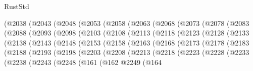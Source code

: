 \begin{lexlean}{RustStd}
\begin{coremodule}
    (@2038
      (@2043
        (@2048
          (@2053
            (@2058
              (@2063
                (@2068
                  (@2073
                    (@2078
                      (@2083
                        (@2088
                          (@2093
                            (@2098
                              (@2103
                                (@2108
                                  (@2113
                                    (@2118
                                      (@2123
                                        (@2128
                                          (@2133
                                            (@2138
                                              (@2143
                                                (@2148
                                                  (@2153
                                                    (@2158
                                                      (@2163
                                                        (@2168
                                                          (@2173
                                                            (@2178
                                                              (@2183
                                                                (@2188
                                                                  (@2193
                                                                    (@2198
                                                                      (@2203
                                                                        (@2208
                                                                          (@2213
                                                                            (@2218
                                                                              (@2223
                                                                                (@2228
                                                                                  (@2233
                                                                                    (@2238
                                                                                      (@2243
                                                                                        (@2248
                                                                                          (@161
                                                                                            (@162
                                                                                              @2249
                                                                                              (@164

\end{coremodule}
\end{lexlean}
